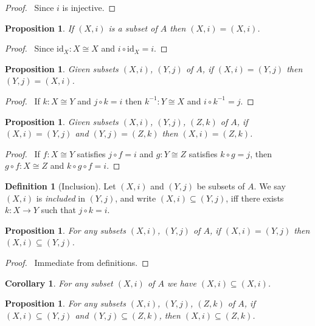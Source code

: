 \documentclass{book}
\let\qed\relax
\newtheorem{prop}[ax]{Proposition}
\newtheorem{cor}{Corollary}[ax]
\theoremstyle{definition}
\newtheorem{df}[ax]{Definition}
\newcommand{\id}[1]{\ensuremath{\mathrm{id}_{#1}}}
\newcommand{\inv}[1]{\ensuremath{{#1}^{-1}}}
\begin{document}
\begin{proof}
\pf\ Since $i$ is injective. \qed
\end{proof}

\begin{prop}
If $(X,i)$ is a subset of $A$ then $(X,i) = (X,i)$.
\end{prop}

\begin{proof}
\pf\ Since $\id{X} : X \cong X$ and $i \circ \id{X} = i$. \qed
\end{proof}

\begin{prop}
Given subsets $(X,i)$, $(Y,j)$ of $A$, if $(X,i) = (Y,j)$ then $(Y,j) = (X,i)$.
\end{prop}

\begin{proof}
\pf\ If $k : X \cong Y$ and $j \circ k = i$ then $\inv{k} : Y \cong X$ and $i \circ \inv{k} = j$. \qed
\end{proof}

\begin{prop}
Given subsets $(X,i)$, $(Y,j)$, $(Z,k)$ of $A$, if $(X,i) = (Y,j)$ and $(Y,j) = (Z,k)$ then $(X,i) = (Z,k)$.
\end{prop}

\begin{proof}
\pf\ If $f : X \cong Y$ satisfies $j \circ f = i$ and $g : Y \cong Z$ satisfies $k \circ g = j$, then $g \circ f : X \cong Z$ and $k \circ g \circ f = i$. \qed
\end{proof}

\begin{df}[Inclusion]
Let $(X,i)$ and $(Y,j)$ be subsets of $A$. We say $(X,i)$ is \emph{included} in $(Y,j)$, and write $(X,i) \subseteq (Y,j)$, iff there exists $k : X \rightarrow Y$ such that $j \circ k = i$.
\end{df}

\begin{prop}
For any subsets $(X,i)$, $(Y,j)$ of $A$, if $(X,i) = (Y,j)$ then $(X,i) \subseteq (Y,j)$.
\end{prop}

\begin{proof}
\pf\ Immediate from definitions. \qed
\end{proof}

\begin{cor}
For any subset $(X,i)$ of $A$ we have $(X,i) \subseteq (X,i)$.
\end{cor}

\begin{prop}
For any subsets $(X,i)$, $(Y,j)$, $(Z,k)$ of $A$, if $(X,i) \subseteq (Y,j)$ and $(Y,j) \subseteq (Z,k)$, then $(X,i) \subseteq (Z,k)$.
\end{prop}
\end{document}
